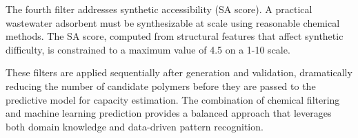 The fourth filter addresses synthetic accessibility (SA score). A practical wastewater adsorbent must be synthesizable at scale using reasonable chemical methods. The SA score, computed from structural features that affect synthetic difficulty, is constrained to a maximum value of 4.5 on a 1-10 scale.

These filters are applied sequentially after generation and validation, dramatically reducing the number of candidate polymers before they are passed to the predictive model for capacity estimation. The combination of chemical filtering and machine learning prediction provides a balanced approach that leverages both domain knowledge and data-driven pattern recognition.
